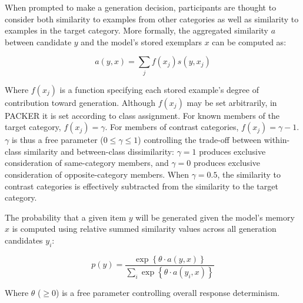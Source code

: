 \documentclass[12pt]{article} \usepackage[letterpaper, margin=1in,
\begin{document}
When prompted to make a generation decision, participants are thought to
consider both similarity to examples from other categories as well as similarity
to examples in the target category. More formally, the aggregated similarity $a$
between candidate $y$ and the model's stored exemplars $x$ can be computed as:

\begin{equation} a(y, x) = \sum_j{f(x_j) s(y, x_j)}
\end{equation}

Where $f(x_j)$ is a function specifying each stored example's degree of
contribution toward generation. Although $f(x_j)$ may be set arbitrarily, in
PACKER it is set according to class assignment. For known members of the target
category, $f(x_j) = \gamma$. For members of contrast categories, $f(x_j) =
\gamma - 1$. $\gamma$ is thus a free parameter ($0 \leq \gamma \leq 1$)
controlling the trade-off between within-class similarity and between-class
dissimilarity: $\gamma = 1$ produces exclusive consideration of same-category
members, and $\gamma = 0$ produces exclusive consideration of opposite-category
members. When $\gamma = 0.5$, the similarity to contrast categories is
effectively subtracted from the similarity to the target category.

The probability that a given item $y$ will be generated given the model's memory
$x$ is computed using relative summed similarity values across all generation
candidates $y_i$:

\begin{equation} p(y) = \dfrac { \exp \left \{ \theta \cdot a \left( y, x
\right) \right \} } { \sum_i{ \exp \left \{ \theta \cdot a \left( y_i, x \right)
\right\} } }
\label{eq:packer-choice}
\end{equation}

Where $\theta$ ($\geq 0$) is a free parameter controlling overall response
determinism.
\end{document}
